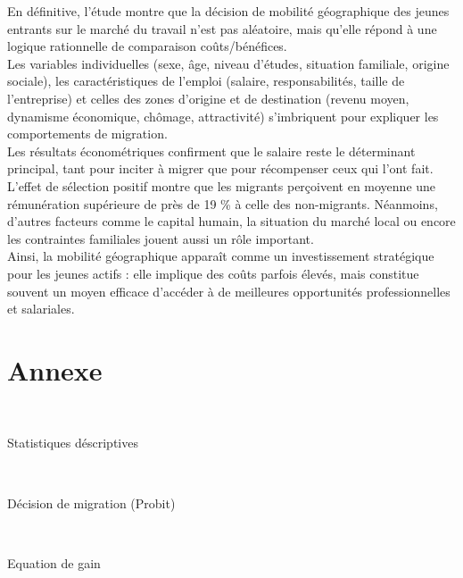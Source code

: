 \documentclass{article}
\begin{document}
En définitive, l’étude montre que la décision de mobilité géographique des jeunes entrants sur le marché du travail n’est pas aléatoire, mais qu’elle répond à une logique rationnelle de comparaison coûts/bénéfices.\\
Les variables individuelles (sexe, âge, niveau d’études, situation familiale, origine sociale), les caractéristiques de l’emploi (salaire, responsabilités, taille de l’entreprise) et celles des zones d’origine et de destination (revenu moyen, dynamisme économique, chômage, attractivité) s’imbriquent pour expliquer les comportements de migration.\\
Les résultats économétriques confirment que le salaire reste le déterminant principal, tant pour inciter à migrer que pour récompenser ceux qui l’ont fait. L’effet de sélection positif montre que les migrants perçoivent en moyenne une rémunération supérieure de près de 19 \% à celle des non-migrants. Néanmoins, d’autres facteurs comme le capital humain, la situation du marché local ou encore les contraintes familiales jouent aussi un rôle important.\\
Ainsi, la mobilité géographique apparaît comme un investissement stratégique pour les jeunes actifs : elle implique des coûts parfois élevés, mais constitue souvent un moyen efficace d’accéder à de meilleures opportunités professionnelles et salariales.

\section{Annexe}

\begin{center}
  \setlength{\fboxsep}{0.1cm} 
  \setlength{\fboxrule}{1pt}
  \\
    \vspace{0.1cm}
    \caption{Statistiques déscriptives}
\end{center}

\vspace{0.25cm}
\begin{center}
  \setlength{\fboxsep}{0.1cm} 
  \setlength{\fboxrule}{1pt}
  \\
    \vspace{0.1cm}
    \caption{Décision de migration (Probit)}
\end{center}

\vspace{0.25cm}
\begin{center}
  \setlength{\fboxsep}{0.1cm} 
  \setlength{\fboxrule}{1pt}
  \\
    \vspace{0.1cm}
    \caption{Equation de gain}
\end{center}
\end{document}
